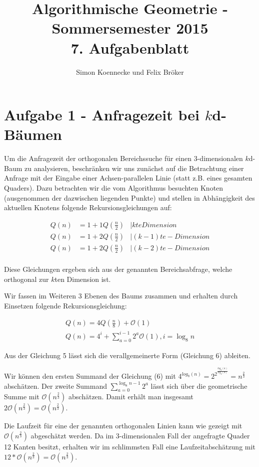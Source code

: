 \documentclass[a4paper]{article}
\begin{document}
\title{Algorithmische Geometrie - Sommersemester 2015\\
       7. Aufgabenblatt }
\author{Simon Koennecke und Felix Bröker}
\date{}
\maketitle

\section*{Aufgabe 1 - Anfragezeit bei $k$d-Bäumen}
Um die Anfragezeit der orthogonalen Bereichssuche für einen 3-dimensionalen $k$d-Baum zu analysieren, 
beschränken wir uns zunächst auf die Betrachtung einer Anfrage mit 
der Eingabe einer Achsen-parallelen Linie (statt z.B. eines gesamten Quaders).
Dazu betrachten wir die vom Algorithmus besuchten Knoten (ausgenommen der dazwischen liegenden
Punkte) und stellen in Abhängigkeit des aktuellen Knotens folgende Rekursionsgleichungen auf:

\begin{align}
 Q(n) &= 1 + 1 Q(\frac{n}{2}) &| kte Dimension\\
 Q(n) &= 1 + 2 Q(\frac{n}{2}) &| (k-1)te-Dimension\\
 Q(n) &= 1 + 2 Q(\frac{n}{2}) &| (k-2)te-Dimension\\ 
\end{align}

Diese Gleichungen ergeben sich aus der genannten Bereichsabfrage, welche
orthogonal zur $k$ten Dimension ist. 

Wir fassen im Weiteren 3 Ebenen des Baums zusammen und erhalten durch Einsetzen folgende Rekursionsgleichung:

\begin{align}
Q(n) = 4 Q(\frac{n}{8}) + \mathcal{O}(1) \\
Q(n) = 4^i + \sum_{a=0}^{i-1} 2^a \mathcal{O}(1), i = \log_8 n
\end{align}

Aus der Gleichung 5 lässt sich die verallgemeinerte Form (Gleichung 6) ableiten. 



Wir können den ersten Summand der Gleichung (6) mit $4^{log_8(n)} = 2^2^{\frac{log_2(n)}{log_2(8)}} =  n^{\frac{2}{3}}$ abschätzen.
Der zweite Summand $\sum_{a=0}^{\log_8 n -1} 2^a$ lässt sich über die geometrische Summe mit $\mathcal{O}(n^{\frac{2}{3}})$ abschätzen. Damit erhält man insgesamt $2 \mathcal{O}(n^{\frac{2}{3}}) = \mathcal{O}(n^{\frac{2}{3}})$.

Die Laufzeit für eine der genannten orthogonalen Linien kann wie gezeigt mit $\mathcal{O}(n^{\frac{2}{3}})$ 
abgeschätzt werden. Da im 3-dimensionalen Fall der angefragte Quader 12 Kanten besitzt, erhalten wir
im schlimmsten Fall eine Laufzeitabschätzung mit $12*\mathcal{O}(n^{\frac{2}{3}}) = \mathcal{O}(n^{\frac{2}{3}})$.
\end{document}
